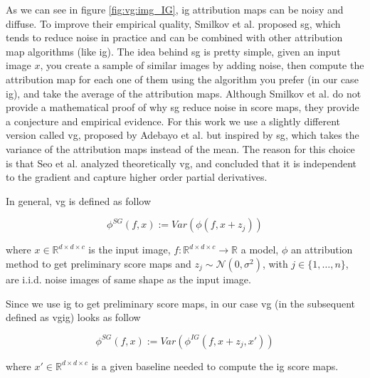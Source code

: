 
\graphicspath{{./Sections/Basics/Resources/}}
\glsresetall

As we can see in figure \ref{fig:vg:img_IG}, \gls{ig} attribution maps can be noisy and diffuse. To improve their empirical quality, Smilkov et al. \cite{Smilkov_smoothgrad} proposed \gls{sg}, which tends to reduce noise in practice and can be combined with other attribution map algorithms (like \gls{ig}). The idea behind \gls{sg} is pretty simple, given an input image $x$, you create a sample of similar images by adding noise, then compute the attribution map for each one of them using the algorithm you prefer (in our case \gls{ig}), and take the average of the attribution maps.
Although Smilkov et al. do not provide a mathematical proof of why \gls{sg} reduce noise in score maps, they provide a conjecture and empirical evidence.
For this work we use a slightly different version called \gls{vg}, proposed by Adebayo et al. \cite{adebayo2018local} but inspired by \gls{sg}, which takes the variance of the attribution maps instead of the mean. The reason for this choice is that Seo et al. \cite{Seo_noise} analyzed theoretically \gls{vg}, and concluded that it is independent to the gradient and capture higher order partial derivatives.

In general, \gls{vg} is defined as follow

\begin{equation}
  \phi^{SG}(f, x) := Var(\phi(f, x + z_j))
\end{equation}

\noindent where $x \in \mathbb{R}^{d \times d \times c}$ is the input image, $f:\mathbb{R}^{d \times d \times c} \rightarrow \mathbb{R}$ a model, $\phi$ an attribution method to get preliminary score maps and $z_j \sim \mathcal{N}(0, \sigma^2)$, with $j\in\{1, \dots, n\}$, are i.i.d. noise images of same shape as the input image.

Since we use \gls{ig} to get preliminary score maps, in our case \gls{vg} (in the subsequent defined as \gls{vgig}) looks as follow

\begin{equation}
  \phi^{SG}(f, x) := Var(\phi^{IG}(f, x + z_j, x'))
\end{equation}

\noindent where $x' \in \mathbb{R}^{d \times d \times c}$ is a given baseline needed to compute the \gls{ig} score maps.

